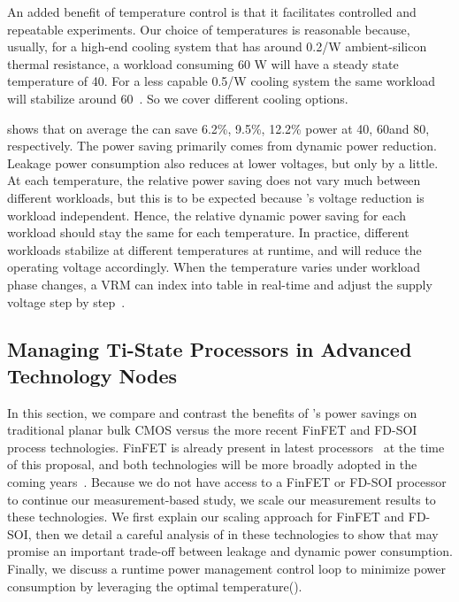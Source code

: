 An added benefit of temperature control is that it facilitates controlled and repeatable experiments. Our choice of temperatures is reasonable because, usually, for a high-end cooling system that has around 0.2\C/W ambient-silicon thermal resistance, a workload consuming 60 W will have a steady state temperature of 40\C. For a less capable 0.5\C/W cooling system the same workload will stabilize around 60\C~\cite{skadron2004temperature,huang2006hotspot,fan2016computational}. So we cover different cooling options.

 shows that on average the \tistates can save 6.2\%, 9.5\%, 12.2\% power at 40\C, 60\C and 80\C, respectively. The power saving primarily comes from dynamic power reduction. Leakage power consumption also reduces at lower voltages, but only by a little. At each temperature, the relative power saving does not vary much between different workloads, but this is to be expected because \tistate's voltage reduction is workload independent. Hence, the relative dynamic power saving for each workload should stay the same for each temperature. In practice, different workloads stabilize at different temperatures at runtime, and \tistate will reduce the operating voltage accordingly. When the temperature varies under workload phase changes, a VRM can index into \tistate table in real-time and adjust the supply voltage step by step~\cite{sriram2016avfs}.


\subsection{Managing Ti-State Processors in Advanced Technology Nodes}
\label{sec:tistate:manage}

In this section, we compare and contrast the benefits of \tistate's power savings on traditional planar bulk CMOS versus the more recent FinFET and FD-SOI process technologies. FinFET is already present in latest processors~\cite{intel22nm,samsung14nm} at the time of this proposal, and both technologies will be more broadly adopted in the coming years~\cite{wu201316nm,natarajan201414nm,lin2014high,liu2014fdsoi}. Because we do not have access to a FinFET or FD-SOI processor to continue our measurement-based study, we scale our measurement results to these technologies. We first explain our scaling approach for FinFET and FD-SOI, then we detail a careful analysis of \tistates in these technologies to show that \tistates may promise an important trade-off between leakage and dynamic power consumption. Finally, we discuss a runtime power management control loop to minimize power consumption by leveraging the optimal temperature().

